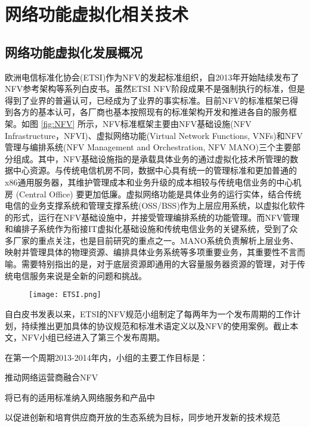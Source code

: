 \chapter{网络功能虚拟化相关技术}
\label{chap:relatedwork}

\section{网络功能虚拟化发展概况}
欧洲电信标准化协会(ETSI)作为NFV的发起标准组织，自2013年开始陆续发布了NFV参考架构等系列白皮书。虽然ETSI NFV阶段成果不是强制执行的标准，但是得到了业界的普遍认可，已经成为了业界的事实标准。目前NFV的标准框架已得到各方的基本认可，各厂商也基本按照现有的标准架构开发和推进各自的服务框架。如图 \ref{fig:NFV} 所示，NFV标准框架主要由NFV基础设施(NFV Infrastructure，NFVI)、虚拟网络功能(Virtual Network Functions, VNFs)和NFV管理与编排系统(NFV Management and Orchestration, NFV MANO)三个主要部分组成。其中，NFV基础设施指的是承载具体业务的通过虚拟化技术所管理的数据中心资源。与传统电信机房不同，数据中心具有统一的管理标准和更加普通的x86通用服务器，其维护管理成本和业务升级的成本相较与传统电信业务的中心机房 (Central Office) 要更加低廉。虚拟网络功能是具体业务的运行实体，结合传统电信的业务支撑系统和管理支撑系统(OSS/BSS)作为上层应用系统，以虚拟化软件的形式，运行在NFV基础设施中，并接受管理编排系统的功能管理。而NFV管理和编排子系统作为衔接IT虚拟化基础设施和传统电信业务的关键系统，受到了众多厂家的重点关注，也是目前研究的重点之一。MANO系统负责解析上层业务、映射并管理具体的物理资源、编排具体业务系统等多项重要业务，其重要性不言而喻。需要特别指出的是，对于底层资源即通用的大容量服务器资源的管理，对于传统电信服务来说是全新的问题和挑战。
\begin{figure}[!htp]
	\centering
	\texttt{[image: ETSI.png]}
\end{figure}
自白皮书发表以来，ETSI的NFV规范小组制定了每两年为一个发布周期的工作计划，持续推出更加具体的协议规范和标准术语定义以及NFV的使用案例。截止本文，NFV小组已经进入了第三个发布周期。

在第一个周期2013-2014年内，小组的主要工作目标是：
\begin{enumerate*}[label=\itshape\alph*)\upshape]
	\item 推动网络运营商融合NFV
	\item 将已有的适用标准纳入网络服务和产品中
	\item 以促进创新和培育供应商开放的生态系统为目标，同步地开发新的技术规范
\end{enumerate*}

